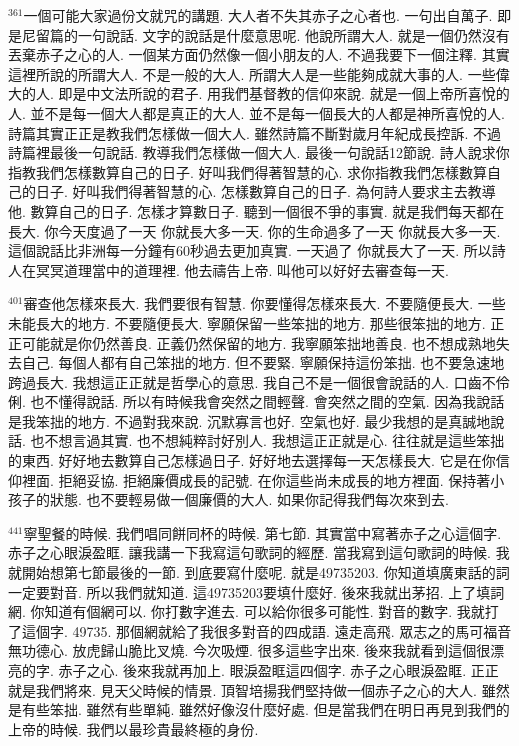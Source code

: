 \documentclass{book}
\begin{document}
$^{361}$一個可能大家過份文就咒的講題.
大人者不失其赤子之心者也.
一句出自萬子.
即是尼留篇的一句說話.
文字的說話是什麼意思呢.
他說所謂大人.
就是一個仍然沒有丟棄赤子之心的人.
一個某方面仍然像一個小朋友的人.
不過我要下一個注釋.
其實這裡所說的所謂大人.
不是一般的大人.
所謂大人是一些能夠成就大事的人.
一些偉大的人.
即是中文法所說的君子.
用我們基督教的信仰來說.
就是一個上帝所喜悅的人.
並不是每一個大人都是真正的大人.
並不是每一個長大的人都是神所喜悅的人.
詩篇其實正正是教我們怎樣做一個大人.
雖然詩篇不斷對歲月年紀成長控訴.
不過詩篇裡最後一句說話.
教導我們怎樣做一個大人.
最後一句說話12節說.
詩人說求你指教我們怎樣數算自己的日子.
好叫我們得著智慧的心.
求你指教我們怎樣數算自己的日子.
好叫我們得著智慧的心.
怎樣數算自己的日子.
為何詩人要求主去教導他.
數算自己的日子.
怎樣才算數日子.
聽到一個很不爭的事實.
就是我們每天都在長大.
你今天度過了一天 你就長大多一天.
你的生命過多了一天 你就長大多一天.
這個說話比非洲每一分鐘有60秒過去更加真實.
一天過了 你就長大了一天.
所以詩人在冥冥道理當中的道理裡.
他去禱告上帝.
叫他可以好好去審查每一天.

$^{401}$審查他怎樣來長大.
我們要很有智慧.
你要懂得怎樣來長大.
不要隨便長大.
一些未能長大的地方.
不要隨便長大.
寧願保留一些笨拙的地方.
那些很笨拙的地方.
正正可能就是你仍然善良.
正義仍然保留的地方.
我寧願笨拙地善良.
也不想成熟地失去自己.
每個人都有自己笨拙的地方.
但不要緊.
寧願保持這份笨拙.
也不要急速地跨過長大.
我想這正正就是哲學心的意思.
我自己不是一個很會說話的人.
口齒不伶俐.
也不懂得說話.
所以有時候我會突然之間輕聲.
會突然之間的空氣.
因為我說話是我笨拙的地方.
不過對我來說.
沉默寡言也好.
空氣也好.
最少我想的是真誠地說話.
也不想言過其實.
也不想純粹討好別人.
我想這正正就是心.
往往就是這些笨拙的東西.
好好地去數算自己怎樣過日子.
好好地去選擇每一天怎樣長大.
它是在你信仰裡面.
拒絕妥協.
拒絕廉價成長的記號.
在你這些尚未成長的地方裡面.
保持著小孩子的狀態.
也不要輕易做一個廉價的大人.
如果你記得我們每次來到去.

$^{441}$寧聖餐的時候.
我們唱同餅同杯的時候.
第七節.
其實當中寫著赤子之心這個字.
赤子之心眼淚盈眶.
讓我講一下我寫這句歌詞的經歷.
當我寫到這句歌詞的時候.
我就開始想第七節最後的一節.
到底要寫什麼呢.
就是49735203.
你知道填廣東話的詞一定要對音.
所以我們就知道.
這49735203要填什麼好.
後來我就出茅招.
上了填詞網.
你知道有個網可以.
你打數字進去.
可以給你很多可能性.
對音的數字.
我就打了這個字.
49735.
那個網就給了我很多對音的四成語.
遠走高飛.
眾志之的馬可福音無功德心.
放虎歸山脆比叉燒.
今次吸煙.
很多這些字出來.
後來我就看到這個很漂亮的字.
赤子之心.
後來我就再加上.
眼淚盈眶這四個字.
赤子之心眼淚盈眶.
正正就是我們將來.
見天父時候的情景.
頂智培揚我們堅持做一個赤子之心的大人.
雖然是有些笨拙.
雖然有些單純.
雖然好像沒什麼好處.
但是當我們在明日再見到我們的上帝的時候.
我們以最珍貴最終極的身份.
\end{document}
